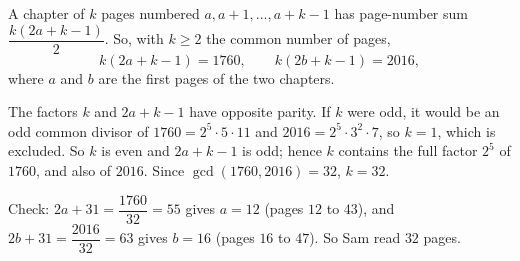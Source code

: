A chapter of $k$ pages numbered $a,a+1,\dots,a+k-1$ has page-number sum $\dfrac{k(2a+k-1)}{2}$. So, with $k\ge2$ the common number of pages,
\[k(2a+k-1)=1760,\qquad k(2b+k-1)=2016,\]
where $a$ and $b$ are the first pages of the two chapters.

The factors $k$ and $2a+k-1$ have opposite parity. If $k$ were odd, it would be an odd common divisor of $1760=2^5\cdot5\cdot11$ and $2016=2^5\cdot3^2\cdot7$, so $k=1$, which is excluded. So $k$ is even and $2a+k-1$ is odd; hence $k$ contains the full factor $2^5$ of $1760$, and also of $2016$. Since $\gcd(1760,2016)=32$, $k=32$.

Check: $2a+31=\dfrac{1760}{32}=55$ gives $a=12$ (pages $12$ to $43$), and $2b+31=\dfrac{2016}{32}=63$ gives $b=16$ (pages $16$ to $47$). So Sam read $\boxed{32}$ pages.
